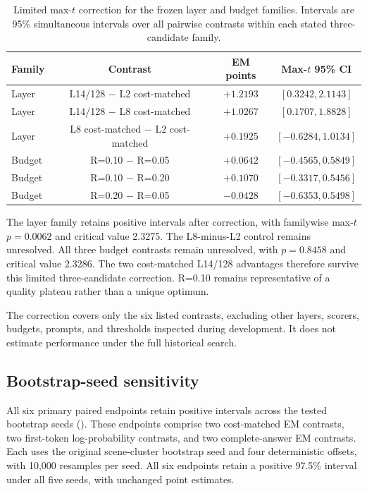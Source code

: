 \begin{table}[t]
\centering
\small
\caption{Limited max-$t$ correction for the frozen layer and budget families. Intervals are 95\% simultaneous intervals over all pairwise contrasts within each stated three-candidate family.}
\label{tab:supp_max_t}
\begin{tabular}{lccc}
\toprule
Family & Contrast & EM points & Max-$t$ 95\% CI \\
\midrule
Layer & L14/128 $-$ L2 cost-matched & $+1.2193$ & $[0.3242,2.1143]$ \\
Layer & L14/128 $-$ L8 cost-matched & $+1.0267$ & $[0.1707,1.8828]$ \\
Layer & L8 cost-matched $-$ L2 cost-matched & $+0.1925$ & $[-0.6284,1.0134]$ \\
Budget & R=0.10 $-$ R=0.05 & $+0.0642$ & $[-0.4565,0.5849]$ \\
Budget & R=0.10 $-$ R=0.20 & $+0.1070$ & $[-0.3317,0.5456]$ \\
Budget & R=0.20 $-$ R=0.05 & $-0.0428$ & $[-0.6353,0.5498]$ \\
\bottomrule
\end{tabular}
\end{table}

The layer family retains positive intervals after correction, with familywise max-$t$ $p=0.0062$ and critical value 2.3275. The L8-minus-L2 control remains unresolved. All three budget contrasts remain unresolved, with $p=0.8458$ and critical value 2.3286. The two cost-matched L14/128 advantages therefore survive this limited three-candidate correction. R=0.10 remains representative of a quality plateau rather than a unique optimum.

The correction covers only the six listed contrasts, excluding other layers, scorers, budgets, prompts, and thresholds inspected during development. It does not estimate performance under the full historical search.

\subsection{Bootstrap-seed sensitivity}
All six primary paired endpoints retain positive intervals across the tested bootstrap seeds (). These endpoints comprise two cost-matched EM contrasts, two first-token log-probability contrasts, and two complete-answer EM contrasts. Each uses the original scene-cluster bootstrap seed and four deterministic offsets, with 10,000 resamples per seed. All six endpoints retain a positive 97.5\% interval under all five seeds, with unchanged point estimates.

